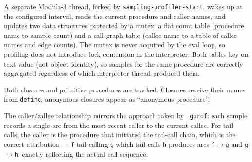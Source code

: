 A separate Modula-3 thread, forked by {\tt sampling-profiler-start},
wakes up at the configured interval, reads the current procedure and
caller names, and updates two data structures protected by a mutex: a
flat count table (procedure name to sample count) and a call graph
table (callee name to a table of caller names and edge counts).  The
mutex is never acquired by the eval loop, so profiling does not
introduce lock contention in the interpreter.  Both tables key on
text value (not object identity), so samples for the same procedure
are correctly aggregated regardless of which interpreter thread
produced them.

Both closures and primitive procedures are tracked.  Closures receive
their names from {\tt define}; anonymous closures appear as
``anonymous procedure''.

The caller/callee relationship mirrors the approach taken by {\tt
  gprof}: each sample records a single arc from the most recent caller
to the current callee.  For tail calls, the caller is the procedure
that initiated the tail-call chain, which is the correct attribution
--- {\tt f} tail-calling {\tt g} which tail-calls {\tt h} produces
arcs {\tt f}$\to${\tt g} and {\tt g}$\to${\tt h}, exactly reflecting
the actual call sequence.

